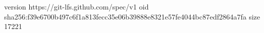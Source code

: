 version https://git-lfs.github.com/spec/v1
oid sha256:f39e6700b497c6f1a813fecc35e06b39888e8321e57fe4044bc87edf2864a7fa
size 17221

